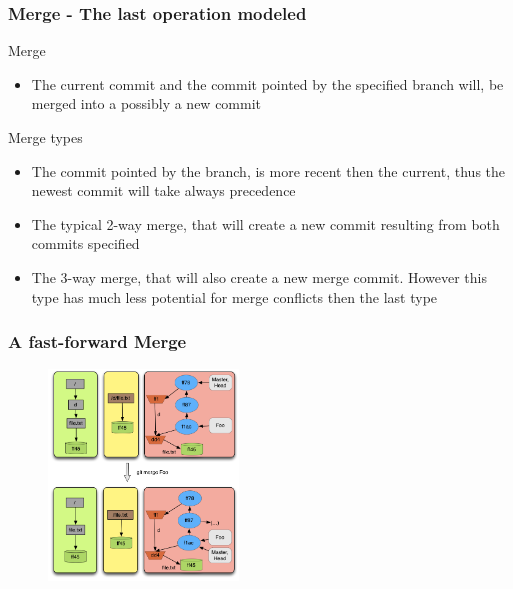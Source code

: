 \documentclass{beamer}
\begin{document}
\begin{frame}
	\frametitle{Merge - The last operation modeled}
	\begin{block}{Merge}
	\begin{itemize}
	\item The current commit and the commit pointed by the specified branch
	will, be merged into a possibly a new commit
	\end{itemize}
	\end{block}
	\begin{block}{Merge types}
	\begin{itemize}
		\item The commit pointed by the branch, is more recent then
		the current, thus the newest commit will take always precedence
		\item The typical 2-way merge, that will create a new commit
		resulting from both commits specified
		\item The 3-way merge, that will also create a new merge commit.
		However this type has much less potential for merge conflicts
		then the last type
	\end{itemize}
	\end{block}
\end{frame}

\begin{frame}[fragile]
   \frametitle{ A fast-forward Merge}
   \begin{figure}
      \centering
      \includegraphics[width=0.45\textwidth]{images/fastforwardmerge.png}
   \end{figure}
\end{frame}
\end{document}
